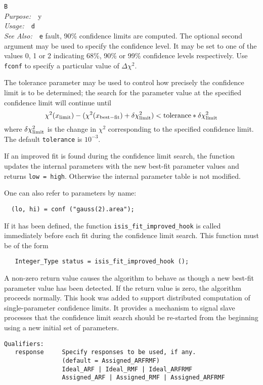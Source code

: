 \documentclass{book}
\makeatletter
\newif\ifpdf
\newenvironment{isisfunction}[4]%
{\index{{#1}@{\tt #1}}%
  \ifpdf
  \else
     \addcontentsline{toc}{subsection}{{#1} -- {#2}}
  \fi
  \vbox{
          \vspace*{\baselineskip}
          {\LARGE\tt #1}\vspace*{\baselineskip}\\
          {{\it Purpose:}~~{#2}}\\
          {{\it Usage:}~~{\tt #3}}\\
          {{\it See Also:}~~{\tt #4}}
       }
}%
{ }
\makeatother
\begin{document}
{\begin{isisfunction}
By default, 90\% confidence limits are computed. The optional
second argument may be used to specify the confidence level. It
may be set to one of the values 0, 1 or 2 indicating 68\%, 90\% or
99\% confidence levels respectively.  Use \verb|fconf| to specify
a particular value of $\Delta\chi^2$.

The tolerance parameter may be used to control how precisely the
confidence limit is to be determined; the search for the parameter
value at the specified confidence limit will continue until
\begin{equation}
  \chi^2(x_{\rm limit}) - (\chi^2(x_{\rm best-fit}) + \delta\chi^2_{\rm
limit}) < {\rm tolerance} * \delta\chi^2_{\rm limit}
\end{equation}
where $\delta\chi^2_{\rm limit}$ is the change in $\chi^2$ corresponding
to the specified confidence limit.  The default \verb|tolerance| is
$10^{-3}$.

If an improved fit is found during the confidence limit search,
the function updates the internal parameters with the new best-fit
parameter values and returns {\tt low = high}.  Otherwise the
internal parameter table is not modified.

One can also refer to parameters by name:
\begin{verbatim}
  (lo, hi) = conf ("gauss(2).area");
\end{verbatim}

If it has been defined, the function
\verb|isis_fit_improved_hook| is called immediately before each
fit during the confidence limit search.  This function must be
of the form
\begin{verbatim}
   Integer_Type status = isis_fit_improved_hook ();
\end{verbatim}
A non-zero return value causes the algorithm to behave as
though a new best-fit parameter value has been detected.  If
the return value is zero, the algorithm proceeds normally. This
hook was added to support distributed computation of
single-parameter confidence limits.  It provides a mechanism to
signal slave processes that the confidence limit search should
be re-started from the beginning using a new initial set of
parameters.

\begin{verbatim}
Qualifiers:
   response     Specify responses to be used, if any.
                (default = Assigned_ARFRMF)
                Ideal_ARF | Ideal_RMF | Ideal_ARFRMF
                Assigned_ARF | Assigned_RMF | Assigned_ARFRMF


\end{verbatim}
\end{isisfunction}}
\end{document}
